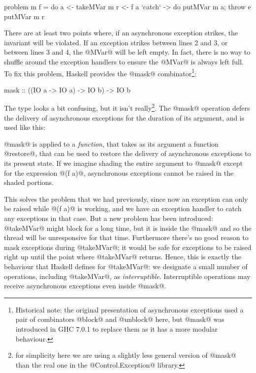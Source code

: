 \begin{numhaskell}
problem m f = do
  a <- takeMVar m
  r <- f a `catch` \e -> do putMVar m a; throw e
  putMVar m r
\end{numhaskell}

\noindent There are at least two points where, if an asynchronous
exception strikes, the invariant will be violated.  If an exception
strikes between lines 2 and 3, or between lines 3 and 4, the @MVar@
will be left empty.  In fact, there is no way to shuffle around the
exception handlers to ensure the @MVar@ is always left full.  To fix
this problem, Haskell provides the @mask@
combinator\footnote{Historical note: the original presentation of
  asynchronous exceptions used a pair of combinators @block@ and
  @unblock@ here, but @mask@ was introduced in GHC 7.0.1 to replace
  them as it has a more modular behaviour.}:

\begin{haskell}
mask :: ((IO a -> IO a) -> IO b) -> IO b
\end{haskell}

\noindent The type looks a bit confusing, but it isn't
really\footnote{for simplicity here we are using a slightly less
  general version of @mask@ than the real one in the
  @Control.Exception@ library.}.  The @mask@ operation defers the
delivery of asynchronous exceptions for the duration of its argument,
and is used like this:


\noindent @mask@ is applied to a \emph{function}, that takes as its
argument a function @restore@, that can be used to restore the
delivery of asynchronous exceptions to its present state.  If we
imagine shading the entire argument to @mask@ except for the
expression @(f a)@, asynchronous exceptions cannot be raised in the
shaded portions.

This solves the problem that we had previously, since now an exception
can only be raised while @(f a)@ is working, and we have an exception
handler to catch any exceptions in that case.  But a new problem has
been introduced: @takeMVar@ might block for a long time, but it is
inside the @mask@ and so the thread will be unresponsive for that
time.  Furthermore there's no good reason to mask exceptions during
@takeMVar@; it would be safe for exceptions to be raised right up
until the point where @takeMVar@ returns.  Hence, this is exactly the
behaviour that Haskell defines for @takeMVar@: we designate a small
number of operations, including @takeMVar@, as \emph{interruptible}.
Interruptible operations may receive asynchronous exceptions even
inside @mask@.

